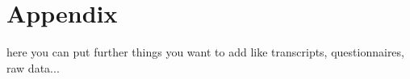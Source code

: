 \chapter{Appendix}

here you can put further things you want to add like transcripts, questionnaires, raw data...